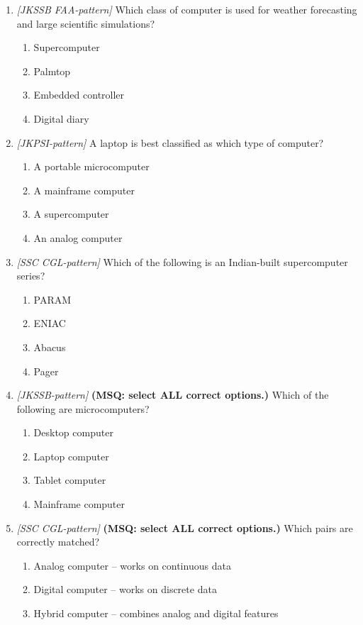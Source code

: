 \begin{enumerate}[label=\textbf{Q\arabic*.}, leftmargin=*]
\item \textit{[JKSSB FAA-pattern]} Which class of computer is used for weather forecasting and large scientific simulations?
  \begin{enumerate}[label=\Alph*.]
    \item Supercomputer
    \item Palmtop
    \item Embedded controller
    \item Digital diary
  \end{enumerate}
\item \textit{[JKPSI-pattern]} A laptop is best classified as which type of computer?
  \begin{enumerate}[label=\Alph*.]
    \item A portable microcomputer
    \item A mainframe computer
    \item A supercomputer
    \item An analog computer
  \end{enumerate}
\item \textit{[SSC CGL-pattern]} Which of the following is an Indian-built supercomputer series?
  \begin{enumerate}[label=\Alph*.]
    \item PARAM
    \item ENIAC
    \item Abacus
    \item Pager
  \end{enumerate}
\item \textit{[JKSSB-pattern]} \textbf{(MSQ: select ALL correct options.)} Which of the following are microcomputers?
  \begin{enumerate}[label=\Alph*.]
    \item Desktop computer
    \item Laptop computer
    \item Tablet computer
    \item Mainframe computer
  \end{enumerate}
\item \textit{[SSC CGL-pattern]} \textbf{(MSQ: select ALL correct options.)} Which pairs are correctly matched?
  \begin{enumerate}[label=\Alph*.]
    \item Analog computer -- works on continuous data
    \item Digital computer -- works on discrete data
    \item Hybrid computer -- combines analog and digital features

\end{enumerate}
\end{enumerate}
